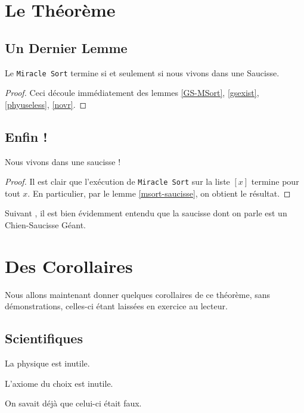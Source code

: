 \documentclass{cours}
\begin{document}
\section{Le Théorème}
\subsection{Un Dernier Lemme}
\begin{lemma}\label{msort-saucisse}
    Le \texttt{Miracle Sort} termine si et seulement si nous vivons dans une Saucisse.
\end{lemma}
\begin{proof}
    Ceci découle immédiatement des lemmes \ref*{GS-MSort}, \ref*{gsexist}, \ref*{phyuseless}, \ref*{novr}.
\end{proof}

\subsection{Enfin !}
\begin{theorem}
    Nous vivons dans une saucisse !
\end{theorem}
\begin{proof}
    Il est clair que l'exécution de \texttt{Miracle Sort} sur la liste $[x]$ termine pour tout $x$. En particulier, par le lemme \ref*{msort-saucisse}, on obtient le résultat.
\end{proof}
\begin{remark}
    Suivant \cite{uvc}, il est bien évidemment entendu que la saucisse dont on parle est un Chien-Saucisse Géant. 
\end{remark}

\section{Des Corollaires}
Nous allons maintenant donner quelques corollaires de ce théorème, sans démonstrations, celles-ci étant laissées en exercice au lecteur. 
\subsection{Scientifiques}
\begin{proposition}
    La physique est inutile.
\end{proposition}

\begin{proposition}\label{acuseless}
    L'axiome du choix est inutile.
\end{proposition}
\begin{remark}
    On savait déjà que celui-ci était faux. 
\end{remark}
\end{document}
